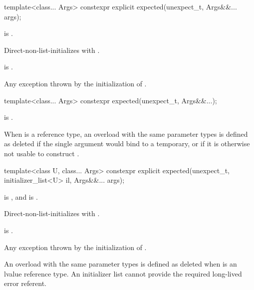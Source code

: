 %
\begin{itemdecl}
template<class... Args> constexpr explicit expected(unexpect_t, Args&&... args);
\end{itemdecl}

\begin{itemdescr}
\pnum
\constraints
{} is .

\pnum
\effects
Direct-non-list-initializes  with .

\pnum
\ensures
{} is .

\pnum
\throws
Any exception thrown by the initialization of .
\end{itemdescr}

%
\begin{itemdecl}
template<class... Args> constexpr expected(unexpect_t, Args&&...);
\end{itemdecl}

\begin{itemdescr}
\pnum
\constraints
{} is .

\pnum
\remarks
When  is a reference type, an overload with the same parameter types is defined as deleted if the single argument would bind  to a temporary, or if it is otherwise not usable to construct .
\end{itemdescr}

%
\begin{itemdecl}
template<class U, class... Args>
constexpr explicit expected(unexpect_t, initializer_list<U> il, Args&&... args);
\end{itemdecl}

\begin{itemdescr}
\pnum
\constraints
{} is , and  is .

\pnum
\effects
Direct-non-list-initializes  with .

\pnum
\ensures
{} is .

\pnum
\throws
Any exception thrown by the initialization of .

\pnum
\remarks
An overload with the same parameter types is defined as deleted when  is an lvalue reference type. An initializer list cannot provide the required long-lived error referent.
\end{itemdescr}

